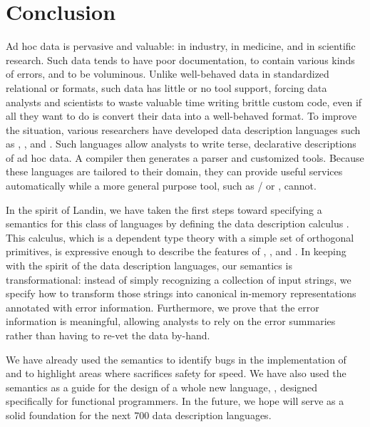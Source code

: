 \section{Conclusion} 
\label{sec:conclusion}

Ad hoc data is pervasive and valuable: in industry, in medicine, and
in scientific research.  Such data tends to have poor documentation,
to contain various kinds of errors, and to be voluminous.  Unlike
well-behaved data in standardized relational or \xml{} formats, such
data has little or no tool support, forcing data analysts and
scientists to waste valuable time writing brittle custom code, even if
all they want to do is convert their data into a well-behaved format.
To improve the situation, various researchers have developed data
description languages such as \pads{}, \datascript{}, and
\packettypes{}.  Such languages allow analysts to write terse,
declarative descriptions of ad hoc data.  A compiler then generates a
parser and customized tools.  Because these languages are tailored to
their domain, they can provide useful services automatically while a
more general purpose tool, such as \lex{}/\yacc{} or \perl{}, cannot.

In the spirit of Landin, we have taken the first steps toward
specifying a semantics for this class of languages by defining the
data description calculus \ddc{}.  This calculus, which is a dependent
type theory with a simple set of orthogonal primitives, is expressive
enough to describe the features of \pads{}, \datascript{}, and
\packettypes{}.  In keeping with the spirit of the data description
languages, our semantics is transformational: instead of simply
recognizing a collection of input strings, we specify how to transform
those strings into canonical in-memory representations annotated with
error information.  Furthermore, we prove that the error information
is meaningful, allowing analysts to rely on the error summaries rather
than having to re-vet the data by-hand.

We have already used the semantics to identify bugs in the
implementation of \padsc{} and to highlight areas where \padsc{}
sacrifices safety for speed.  We have also used the semantics as a guide
for the design of a whole new language, \padsml{}, designed
specifically for functional programmers.  In the future, we hope 
\ddc{} will serve as a solid foundation for the next 700 data 
description languages.
